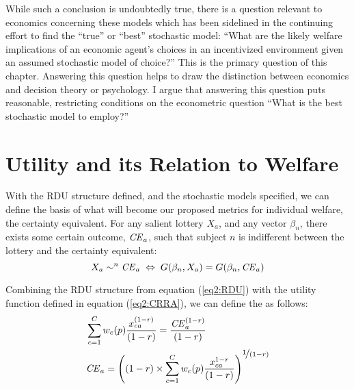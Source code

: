 \documentclass[../main.tex]{subfiles}
\begin{document}
\addtocounter{footnote}{-1}

While such a conclusion is undoubtedly true, there is a question relevant to economics concerning these models which has been sidelined in the continuing effort to find the \enquote{true} or \enquote{best} stochastic model: \enquote{What are the likely welfare implications of an economic agent's choices in an incentivized environment given an assumed stochastic model of choice?} This is the primary question of this chapter.
Answering this question helps to draw the distinction between economics and decision theory or psychology.
I argue that answering this question puts reasonable, restricting conditions on the econometric question \enquote{What is the best stochastic model to employ?}

\singlespacing
\section{Utility and its Relation to Welfare}
\doublespacing

With the RDU structure defined, and the stochastic models specified, we can define the basis of what will become our proposed metrics for individual welfare, the certainty equivalent.
For any salient lottery $X_a$, and any vector $\beta_n$, there exists some certain outcome, $\mathit{CE}_a$, such that subject $n$ is indifferent between the lottery and the certainty equivalent:
\begin{equation}
	\label{eq2:CE.indiff}
	X_a \sim^n {\mathit{CE}}_a \;\Leftrightarrow\; G(\beta_n,X_a) = G(\beta_n, {\mathit{CE}}_a)
\end{equation}

Combining the RDU structure from equation (\ref{eq2:RDU}) with the utility function defined in equation (\ref{eq2:CRRA}), we can define the {\CE} as follows:
\begin{align}
	\label{eq2:CEcalc}
	\begin{split}
		&\sum_{c=1}^{C} w_c(p) \frac{x_{ca}^{(1-r)}}{(1-r)} = \frac{ {\mathit{CE}}_a^{(1-r)}}{(1-r)}\\
		&{\mathit{CE}}_a =  \left( (1-r) \times \sum_{c=1}^{C} w_c(p) \frac{x_{ca}^{1-r}}{(1-r)} \right)^{ \displaystyle\nicefrac{1}{(1-r)} }
	\end{split}
\end{align}
\end{document}
